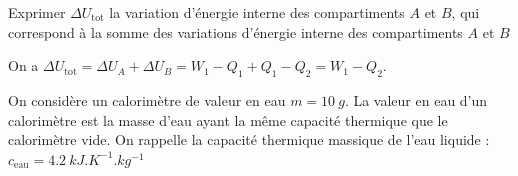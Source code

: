 

\begin{enonce}
Exprimer $\Delta U_{\text{tot}}$ la variation d'énergie interne des compartiments $A$ et $B$, qui correspond à la somme des variations d'énergie interne des compartiments $A$ et $B$
\end{enonce}


\begin{corrige}
On a $\Delta U_{\text{tot}}=\Delta U_A + \Delta U_B = W_1 - Q_1 +Q_1 - Q_2=W_1 - Q_2$.
\end{corrige}


\finEntrainement








\hauteurLargeurCadreReponse		{8mm}{5cm}
\initialisationEntrainement



\debutEntrainement
	On considère un calorimètre de valeur en eau $m=\SI{10}{g}$. La valeur en eau d'un calorimètre est la masse d'eau ayant la même capacité thermique que le calorimètre vide.
\newline
On rappelle la capacité thermique massique de l'eau liquide : $c_{\text{eau}}=\SI{4,2 }{kJ.K^{-1}.kg^{-1}}$

